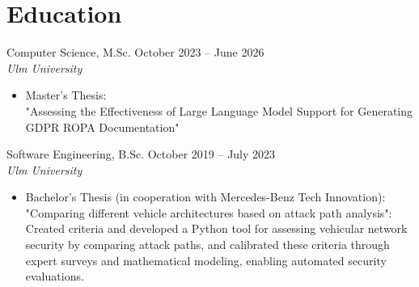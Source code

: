 \section*{Education}

{\companyfont Computer Science, M.Sc.} \hfill \textcolor{shadeGray}{October 2023 – June 2026}\\
    \textit{Ulm University \hfill }
    \begin{itemize}
        \item Master's Thesis: \\
        "Assessing the Effectiveness of Large Language Model Support for Generating GDPR ROPA Documentation"
    \end{itemize}

\subsectionspacing

{\companyfont Software Engineering, B.Sc.} \hfill \textcolor{shadeGray}{October 2019 – July 2023}\\
    \textit{Ulm University \hfill }
    \begin{itemize}
        \item Bachelor's Thesis (in cooperation with Mercedes-Benz Tech Innovation): \\
        "Comparing different vehicle architectures based on attack path analysis": Created criteria and developed a Python tool for assessing vehicular network security by comparing attack paths, and calibrated these criteria through expert surveys and mathematical modeling, enabling automated security evaluations.
    \end{itemize}



